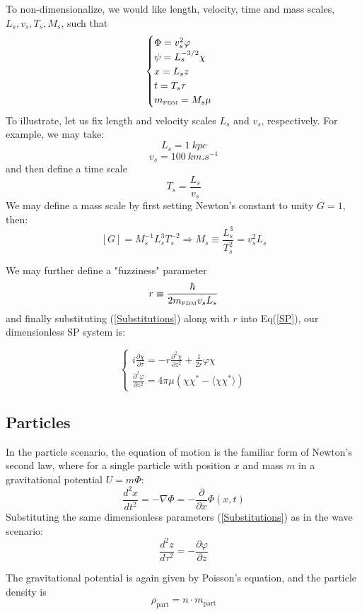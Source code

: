 \documentclass{article}
\newcommand{\pd}{\partial}
\begin{document}
To non-dimensionalize, we would like length, velocity, time and mass scales, $L_s, v_s,T_s,M_s$, such that
\begin{equation}
    \begin{cases}
    \Phi = v_s^2 \varphi\\
    \psi = L_s^{-3/2} \chi\\
    x = L_s z\\
    t = T_s \tau\\
    m_\text{\tiny{FDM}} = M_s \mu
    \end{cases}
    \label{Substitutions}
\end{equation}
To illustrate, let us fix length and velocity scales $L_s$ and $v_s$, respectively. For example, we may take:
$$L_s = \SI{1}{kpc} $$
$$v_s = \SI{100}{km.s^{-1}}$$
and then define a time scale 
$$T_s  = \frac{L_s}{v_s}$$
We may define a mass scale by first setting Newton's constant to unity $G = 1$, then:
$$[G] = M_s^{-1} L_s^3 T_s^{-2} \Rightarrow M_s \equiv \frac{L_s^3}{T_s^2} = v_s^2 L_s$$

We may further define a "fuzziness" parameter 
$$r \equiv \frac{\hbar}{2 m_\text{\tiny{FDM}} v_s L_s}$$
and finally substituting (\ref{Substitutions}) along with $r$ into Eq(\ref{SP}), our dimensionless SP system is:

\begin{equation}
    \begin{cases}
    i\frac{\pd \chi}{\pd \tau} = -r\frac{\pd^2 \chi}{\pd z^2} + \frac{1}{2r}\varphi\chi \\
    
    \frac{\pd^2 \varphi}{\pd z^2} = 4\pi\mu (\chi\chi^* - \langle\chi\chi^*\rangle)
    \end{cases}
    \label{SP-NonDim}
\end{equation}

\subsection{Particles}
In the particle scenario, the equation of motion is the familiar form of Newton's second law, where for a single particle with position $x$ and mass $m$ in a gravitational potential $U = m\Phi$:
$$\frac{d^2 x}{d t^2} = -\nabla\Phi = -\frac{\pd}{\pd x}\Phi(x,t)$$
Substituting the same dimensionless parameters (\ref{Substitutions}) as in the wave scenario:
$$\frac{d^2 z}{d\tau^2} = -\frac{\pd \varphi}{\pd z}$$

The gravitational potential is again given by Poisson's equation, and the particle density is 
\begin{equation}
\rho_\text{part} = n \cdot m_{\text{part}}
\label{Particle density}
\end{equation}
\end{document}
